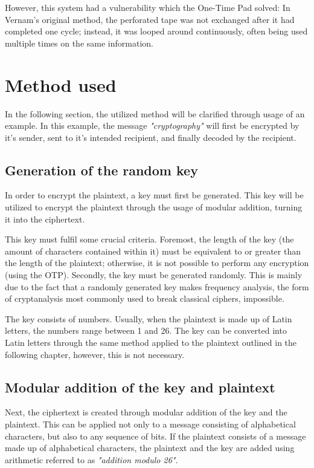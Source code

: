 \documentclass[12pt]{report}
\begin{document}
However, this system had a vulnerability which the One-Time Pad solved: In Vernam's original method, the perforated tape was not exchanged after it had completed one cycle; instead, it was looped around continuously, often being used multiple times on the same information.    

\section{Method used}
In the following section, the utilized method will be clarified through usage of an example. In this example, the message \textit{"cryptography"} will first be encrypted by it's sender, sent to it's intended recipient, and finally decoded by the recipient.

\subsection{Generation of the random key}
In order to encrypt the plaintext, a key must first be generated. This key will be utilized to encrypt the plaintext through the usage of modular addition, turning it into the ciphertext.

This key must fulfil some crucial criteria. Foremost, the length of the key (the amount of  characters contained within it) must be equivalent to or greater than the length of the plaintext; otherwise, it is not possible to perform any encryption (using the OTP). Secondly, the key must be generated randomly. This is mainly due to the fact that a randomly generated key makes frequency analysis\cite{frequencyanalysis}, the form of cryptanalysis most commonly used to break classical ciphers, impossible.

The key consists of numbers. Usually, when the plaintext is made up of Latin letters, the numbers range between 1 and 26. The key can be converted into Latin letters through the same method applied to the plaintext outlined in the following chapter, however, this is not necessary. 

\subsection{Modular addition of the key and plaintext}
Next, the ciphertext is created through modular addition of the key and the plaintext. This can be applied not only to a message consisting of alphabetical characters, but also to any sequence of bits. If the plaintext consists of a message made up of alphabetical characters, the plaintext and the key are added using arithmetic referred to as \textit{"addition modulo 26"}. 
\end{document}
